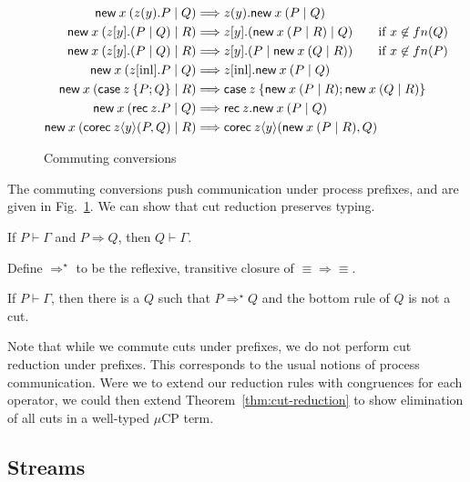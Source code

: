 \documentclass[orivec,envcountsame]{llncs}
\newcommand{\cptyp}[2]{#1 \vdash #2}
\newcommand{\mkwd}[1]{\mathsf{#1}}
\newcommand{\cut}[4]{\mkwd{new}\:#1 \: (#3 \mid #4)}
\newcommand{\rec}[1]{\mkwd{rec}\:#1}
\newcommand{\corec}[5]{\mkwd{corec}\:#1 \langle #2 \rangle (#4,#5)}
\newcommand{\clabel}[1]{\mathrm{#1}}
\renewcommand{\case}[2]{\mkwd{case}\:#1\:\{#2\}}
\newcommand{\sel}[2]{#1[\clabel{#2}]}
\newcommand{\mucp}{$\mu\mathrm{CP}$\xspace}
\begin{document}
\begin{figure}\small
\begin{align*}
  \cut{x}{A}{z(y).P}{Q} &\Longrightarrow z(y).\cut{x}{A}{P}{Q} \\
  \cut{x}{A}{z[y].(P \mid Q)}{R} &\Longrightarrow z[y].(\cut{x}{A}{P}{R} \mid Q) \text{\quad \quad if $x \not\in fn(Q)$} \\
  \cut{x}{A}{z[y].(P \mid Q)}{R} &\Longrightarrow z[y].(P \mid \cut{x}{A}{Q}{R}) \text{\quad \quad if $x \not\in fn(P)$} \\
  \cut{x}{A}{\sel{z}{inl}.P}{Q} &\Longrightarrow \sel{z}{inl}.\cut{x}{A}{P}{Q} \\
  \cut{x}{A}{\case{z}{P;Q}}{R} &\Longrightarrow \case{z}{\cut{x}{A}{P}{R}; \cut{x}{A}{Q}{R}} \\
  \cut{x}{A}{\rec{z}.P}{Q} &\Longrightarrow \rec{z}.\cut{x}{A}{P}{Q} \\
  \cut{x}{A}{\corec{z}{y}{B}{P}{Q}}{R} &\Longrightarrow \corec{z}{y}{B}{\cut{x}{A}{P}{R}}{Q}
\end{align*}
\caption{Commuting conversions}\label{fig:commuting}
\end{figure}

The commuting conversions push communication under process prefixes, and are given in
Fig.~\ref{fig:commuting}.  We can show that cut reduction preserves typing.

\begin{theorem}
  If $\cptyp{P}{\Gamma}$ and $P \Longrightarrow Q$, then $\cptyp{Q}{\Gamma}.$
\end{theorem}

Define $\Longrightarrow^\star$ to be the reflexive, transitive closure of $\equiv\Longrightarrow\equiv$.

\begin{theorem}\label{thm:cut-reduction}
  If $\cptyp{P}{\Gamma}$, then there is a $Q$ such that $P \Longrightarrow^\star Q$ and the bottom
  rule of $Q$ is not a cut.
\end{theorem}

Note that while we commute cuts under prefixes, we do not perform cut reduction under prefixes.
This corresponds to the usual notions of process communication.  Were we to extend our reduction
rules with congruences for each operator, we could then extend Theorem~\ref{thm:cut-reduction} to
show elimination of all cuts in a well-typed \mucp term.

\subsection{Streams}
\end{document}
